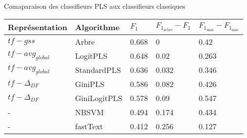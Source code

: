 \begin{frame}[t]{\mysubsectiontitle}
	Comaparaison des classifieurs PLS aux classifieurs classiques

	\scriptsize
	\centering
	\begin{tabular}{|l|l|l|l|l|}
		\hline
		\textbf{Représentation} & \textbf{Algorithme} & \textbf{$F_{1}$} & $F_{1_\text{arbre}} - F_1$ & \textbf{$F_{1_\text{max}} - F_{1_\text{min}}$} \\ \hline
		
		$tf-gss$ & Arbre & 0.668 & 0 & 0.42\\ \hline
		$tf - avg_{global}$ & LogitPLS & 0.648 & 0.02 & 0.263  \\ \hline
		$tf - avg_{global}$ & StandardPLS & 0.636 & 0.032 & 0.346 \\ \hline
		$tf - \Delta_{DF}$ & GiniPLS & 0.586 & 0.082 & 0.426 \\ \hline
		$tf - \Delta_{DF}$ & GiniLogitPLS & 0.578 & 0.09 & 0.547 \\ \hline
		- & NBSVM & 0.494 & 0.174 & 0.434  \\ \hline
		- & fastText & 0.412 & 0.256 & 0.127 \\ \hline
	\end{tabular}	

\end{frame}

